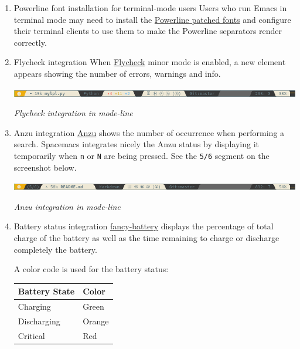 \documentclass[11pt]{article}
\begin{document}
\begin{enumerate}
\item Powerline font installation for terminal-mode users
\label{sec:org545e9af}
Users who run Emacs in terminal mode may need to install the \href{https://github.com/powerline/fonts}{Powerline patched
fonts} and configure their terminal clients to use them to make the Powerline
separators render correctly.

\item Flycheck integration
\label{sec:org5995c01}
When \href{https://github.com/flycheck/flycheck}{Flycheck} minor mode is enabled, a new element appears showing the number of
errors, warnings and info.

\begin{center}
\includegraphics[width=.9\linewidth]{img/powerline-wave.png}
\end{center}
\emph{Flycheck integration in mode-line}

\item Anzu integration
\label{sec:org1efff25}
\href{https://github.com/syohex/emacs-anzu}{Anzu} shows the number of occurrence when performing a search. Spacemacs
integrates nicely the Anzu status by displaying it temporarily when \texttt{n} or \texttt{N}
are being pressed. See the \texttt{5/6} segment on the screenshot below.

\begin{center}
\includegraphics[width=.9\linewidth]{img/powerline-anzu.png}
\end{center}
\emph{Anzu integration in mode-line}

\item Battery status integration
\label{sec:org94ffc5e}
\href{https://github.com/lunaryorn/fancy-battery.el}{fancy-battery} displays the percentage of total charge of the battery as well as
the time remaining to charge or discharge completely the battery.

A color code is used for the battery status:

\begin{center}
\begin{tabular}{ll}
Battery State & Color\\
\hline
Charging & Green\\
Discharging & Orange\\
Critical & Red\\
\end{tabular}
\end{center}


\end{enumerate}
\end{document}
